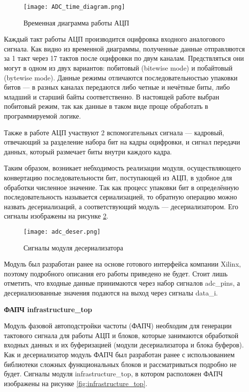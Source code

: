 \begin{figure}[ht]
    \centering
    \texttt{[image: ADC\_time\_diagram.png]}
    \caption{Временная диаграмма работы АЦП}
    \label{fig:ADC_time_diagram}
\end{figure}
Каждый такт работы АЦП производится оцифровка входного аналогового сигнала. Как видно из временной диаграммы, полученные данные отправляются за 1 такт через 17 тактов после оцифровки по двум каналам. Предствляться они могут в одном из двух вариантов: побитовый (bitewise mode) и побайтовый (bytewise mode). Данные режимы отличаются последовательностью упаковки битов --- в разных каналах передаются либо четные и нечётные биты, либо младший и старший байты соответственно. В настоящей работе выбран побитовый режим, так как данные в таком виде проще обработать в программируемой логике.\par
Также в работе АЦП участвуют 2 вспомогательных сигнала --- кадровый, отвечающий за разделение набора бит на кадры оцифровки, и сигнал передачи данных, который размечает биты внутри каждого кадра.\par
Таким образом, возникает небходимость реализации модуля, осуществляющего конвертацию последовательности бит, поступающей из АЦП, в удобное для обработки численное значение. Так как процесс упаковки бит в определённую последовательность называется сериализацией, то обратную операцию можно назвать десериализаций, а соответствующий модуль --- десериализатором. Его сигналы изображены на рисунке \ref{fig:adc_deser}.\par
\begin{figure}[ht]
    \centering
    \texttt{[image: adc\_deser.png]}
    \caption{Сигналы модуля десериализатора}
    \label{fig:adc_deser}
\end{figure}
Модуль был разработан ранее на основе готового интерфейса компании Xilinx, поэтому подробного описания его работы приведено не будет. Стоит лишь отметить, что входные данные принимаются через набор сигналов adc\_pins, а десериализованные значения подаются на выход через сигналы data\_i.\par
\textbf{ФАПЧ infrastructure\_top}\par
Модуль фазовой автоподстройки частоты (ФАПЧ) необходим для генерации тактового сигнала для работы АЦП и блоков, которые занимаются обработкой входных данных и их буферизацией (модули десериализатора и блока буферов). Как и десериализатор модуль ФАПЧ был разработан ранее с использованием библиотеки сложных функциональных блоков и рассматриваться подробно не будет. Сигналы модуля infrastructure\_top, в котором расположен ФАПЧ изображены на рисунке \ref{fig:infrastructure_top}.\par
